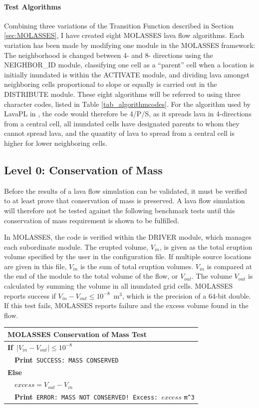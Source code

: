 \documentclass[12pt,letter]{article}
\begin{document}
\paragraph{Test Algorithms} Combining three variations of the Transition Function described in Section \ref{sec:MOLASSES}, I have created eight MOLASSES lava flow algorithms. Each variation has been made by modifying one module in the MOLASSES framework: The neighborhood is changed between 4- and 8- directions using the NEIGHBOR\_ID module, classifying one cell as a ``parent'' cell when a location is initially inundated is within the ACTIVATE module, and dividing lava amongst neighboring cells proportional to slope or equally is carried out in the DISTRIBUTE module. These eight algorithms will be referred to using three character codes, listed in Table \ref{tab_algorithmcodes}. For the algorithm used by LavaPL in \citet{connor2012}, the code would therefore be 4/P/S, as it spreads lava in 4-directions from a central cell, all inundated cells have designated parents to whom they cannot spread lava, and the quantity of lava to spread from a central cell is higher for lower neighboring cells.

	\subsection{Level 0: Conservation of Mass}
			Before the results of a lava flow simulation can be validated, it must be verified to at least prove that conservation of mass is preserved. A lava flow simulation will therefore not be tested against the following benchmark tests until this conservation of mass requirement is shown to be fulfilled.
			
			In MOLASSES, the code is verified within the DRIVER module, which manages each subordinate module. The erupted volume, $V_{in}$, is given as the total eruption volume specified by the user in the configuration file. If multiple source locations are given in this file, $V_{in}$ is the sum of total eruption volumes. $V_{in}$ is compared at the end of the module to the total volume of the flow, or $V_{out}$. The volume $V_{out}$ is calculated by summing the volume in all inundated grid cells. MOLASSES reports success if $V_{in}-V_{out} \le 10^{-8}$~m$^3$, which is the precision of a 64-bit double. If this test fails, MOLASSES reports failure and the excess volume found in the flow.
	
			\begin{center}
				\begin{tabular}{l}
					\toprule
					\textbf{MOLASSES Conservation of Mass Test}\\
					\midrule
					\textbf{If}~$|V_{in}-V_{out}| \le 10^{-8}$\\
					~~\textbf{Print}~\verb|SUCCESS: MASS CONSERVED|\\
					\textbf{Else}\\
					~~$excess = V_{out}-V_{in}$\\
					~~\textbf{Print}~\verb|ERROR: MASS NOT CONSERVED! Excess: |$excess$ \verb|m^3|\\
					\bottomrule
				\end{tabular}
			\end{center}
\end{document}
